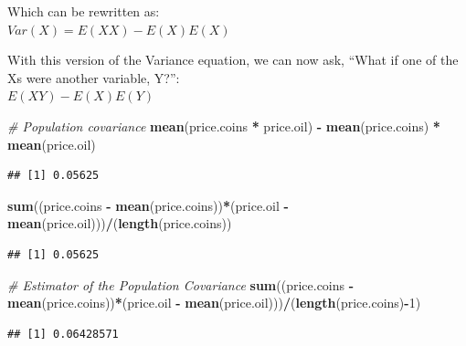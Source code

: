 \documentclass[]{article}
\newenvironment{Shaded}{\begin{snugshade}}{\end{snugshade}}
\newcommand{\CommentTok}[1]{\textcolor[rgb]{0.56,0.35,0.01}{\textit{#1}}}
\newcommand{\DecValTok}[1]{\textcolor[rgb]{0.00,0.00,0.81}{#1}}
\newcommand{\KeywordTok}[1]{\textcolor[rgb]{0.13,0.29,0.53}{\textbf{#1}}}
\newcommand{\NormalTok}[1]{#1}
\newcommand{\OperatorTok}[1]{\textcolor[rgb]{0.81,0.36,0.00}{\textbf{#1}}}
\newcommand{\StringTok}[1]{\textcolor[rgb]{0.31,0.60,0.02}{#1}}
\begin{document}
Which can be rewritten as:\\
\(Var(X) = E(XX) - E(X)E(X)\)

With this version of the Variance equation, we can now ask, ``What if
one of the Xs were another variable, Y?'':\\
\(E(XY) - E(X)E(Y)\)

\begin{Shaded}
\begin{Highlighting}[]
\CommentTok{# Population covariance}
\KeywordTok{mean}\NormalTok{(price.coins }\OperatorTok{*}\StringTok{ }\NormalTok{price.oil) }\OperatorTok{-}\StringTok{ }\KeywordTok{mean}\NormalTok{(price.coins) }\OperatorTok{*}\StringTok{ }\KeywordTok{mean}\NormalTok{(price.oil)}
\end{Highlighting}
\end{Shaded}

\begin{verbatim}
## [1] 0.05625
\end{verbatim}

\begin{Shaded}
\begin{Highlighting}[]
\KeywordTok{sum}\NormalTok{((price.coins }\OperatorTok{-}\StringTok{ }\KeywordTok{mean}\NormalTok{(price.coins))}\OperatorTok{*}\NormalTok{(price.oil }\OperatorTok{-}\StringTok{ }\KeywordTok{mean}\NormalTok{(price.oil)))}\OperatorTok{/}\NormalTok{(}\KeywordTok{length}\NormalTok{(price.coins))}
\end{Highlighting}
\end{Shaded}

\begin{verbatim}
## [1] 0.05625
\end{verbatim}

\begin{Shaded}
\begin{Highlighting}[]
\CommentTok{# Estimator of the Population Covariance}
\KeywordTok{sum}\NormalTok{((price.coins }\OperatorTok{-}\StringTok{ }\KeywordTok{mean}\NormalTok{(price.coins))}\OperatorTok{*}\NormalTok{(price.oil }\OperatorTok{-}\StringTok{ }\KeywordTok{mean}\NormalTok{(price.oil)))}\OperatorTok{/}\NormalTok{(}\KeywordTok{length}\NormalTok{(price.coins)}\OperatorTok{-}\DecValTok{1}\NormalTok{)}
\end{Highlighting}
\end{Shaded}

\begin{verbatim}
## [1] 0.06428571
\end{verbatim}
\end{document}

